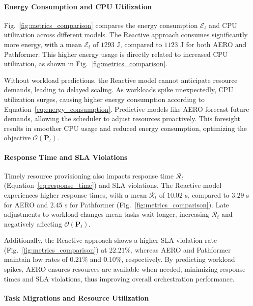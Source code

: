 \documentclass{ieeetmlcn}
\begin{document}
\paragraph*{Energy Consumption and CPU Utilization}

Fig.~\ref{fig:metrics_comparison} compares the energy consumption $\mathcal{E}_t$ and CPU utilization across different models. The Reactive approach consumes significantly more energy, with a mean $\mathcal{E}_t$ of $1293$ J, compared to $1123$ J for both AERO and Pathformer. This higher energy usage is directly related to increased CPU utilization, as shown in Fig.~\ref{fig:metrics_comparison}.

Without workload predictions, the Reactive model cannot anticipate resource demands, leading to delayed scaling. As workloads spike unexpectedly, CPU utilization surges, causing higher energy consumption according to Equation~\eqref{eq:energy_consumption}. Predictive models like AERO forecast future demands, allowing the scheduler to adjust resources proactively. This foresight results in smoother CPU usage and reduced energy consumption, optimizing the objective $\mathcal{O}(\mathbf{P}_t)$.

\paragraph*{Response Time and SLA Violations}

Timely resource provisioning also impacts response time $\mathcal{R}_t$ (Equation~\eqref{eq:response_time}) and SLA violations. The Reactive model experiences higher response times, with a mean $\mathcal{R}_t$ of $10.02$ s, compared to $3.29$ s for AERO and $2.45$ s for Pathformer (Fig.~\ref{fig:metrics_comparison}). Late adjustments to workload changes mean tasks wait longer, increasing $\mathcal{R}_t$ and negatively affecting $\mathcal{O}(\mathbf{P}_t)$.

Additionally, the Reactive approach shows a higher SLA violation rate (Fig.~\ref{fig:metrics_comparison}) at $22.21\%$, whereas AERO and Pathformer maintain low rates of $0.21\%$ and $0.10\%$, respectively. By predicting workload spikes, AERO ensures resources are available when needed, minimizing response times and SLA violations, thus improving overall orchestration performance.

\paragraph*{Task Migrations and Resource Utilization}
\end{document}
